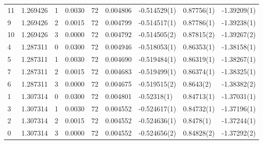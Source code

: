 \begin{tabular}{lrrrrrlll}
11 &  1.269426 &       1 &    0.0030 &     72 &  0.004806 &   -0.514529(1) &  0.87756(1) &  -1.39209(1) \\
9  &  1.269426 &       2 &    0.0015 &     72 &  0.004799 &   -0.514517(1) &  0.87786(1) &  -1.39238(1) \\
10 &  1.269426 &       3 &    0.0000 &     72 &  0.004792 &   -0.514505(2) &  0.87815(2) &  -1.39267(2) \\
4  &  1.287311 &       0 &    0.0300 &     72 &  0.004946 &   -0.518053(1) &  0.86353(1) &  -1.38158(1) \\
5  &  1.287311 &       1 &    0.0030 &     72 &  0.004690 &   -0.519484(1) &  0.86319(1) &  -1.38267(1) \\
7  &  1.287311 &       2 &    0.0015 &     72 &  0.004683 &   -0.519499(1) &  0.86374(1) &  -1.38325(1) \\
6  &  1.287311 &       3 &    0.0000 &     72 &  0.004675 &   -0.519515(2) &   0.8643(2) &  -1.38382(2) \\
1  &  1.307314 &       0 &    0.0300 &     72 &  0.004801 &    -0.52318(1) &  0.84713(1) &  -1.37031(1) \\
3  &  1.307314 &       1 &    0.0030 &     72 &  0.004552 &   -0.524617(1) &  0.84732(1) &  -1.37196(1) \\
2  &  1.307314 &       2 &    0.0015 &     72 &  0.004552 &   -0.524636(1) &   0.8478(1) &  -1.37244(1) \\
0  &  1.307314 &       3 &    0.0000 &     72 &  0.004552 &   -0.524656(2) &  0.84828(2) &  -1.37292(2) \\
\bottomrule
\end{tabular}
